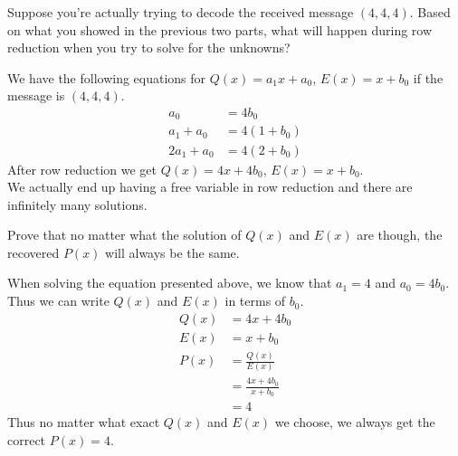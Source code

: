 \documentclass[11pt]{article}
\begin{document}
\begin{Parts}
    \newpage
    \Part Suppose you're actually trying to decode the received message $(4,4,4)$. Based on what you showed in the previous two 
          parts, what will happen during row reduction when you try to solve for the unknowns? 

    \begin{Answer}
        We have the following equations for $Q(x) = a_1x + a_0$, $E(x) = x + b_0$ if the message is $(4,4,4)$. 
        \begin{align*}
            a_0         &= 4b_0 \\
            a_1 + a_0   &= 4(1 + b_0) \\
            2a_1 + a_0  &= 4(2 + b_0)
        \end{align*}
        After row reduction we get $Q(x) = 4x + 4b_0$, $E(x) = x + b_0$. \\
        We actually end up having a free variable in row reduction and there are infinitely many solutions. 
    \end{Answer}

    \Part Prove that no matter what the solution of $Q(x)$ and $E(x)$ are though, the recovered $P(x)$ will always be the same. 

    \begin{Answer}
        When solving the equation presented above, we know that $a_1 = 4$ and $a_0 = 4b_0$. Thus we can write $Q(x)$ and $E(x)$ 
        in terms of $b_0$. 
        \begin{align*}
            Q(x) &= 4x + 4b_0 \\
            E(x) &= x + b_0 \\
            P(x) &= \frac{Q(x)}{E(x)} \\
                 &= \frac{4x + 4b_0}{x + b_0} \\
                 &= 4
        \end{align*}
        Thus no matter what exact $Q(x)$ and $E(x)$ we choose, we always get the correct $P(x) = 4$. 
    \end{Answer}

\end{Parts}

\newpage
{}
\end{document}
